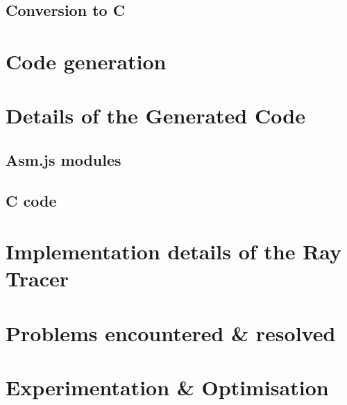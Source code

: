 \documentclass[11pt]{report}
\begin{document}
\subsection{Conversion to C}


\section{Code generation}


\section{Details of the Generated Code}
\subsection{Asm.js modules}
\subsection{C code}


\section{Implementation details of the Ray Tracer}

\section{Problems encountered \& resolved}
\section{Experimentation \& Optimisation}

\end{document}
